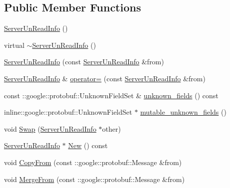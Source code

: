 \subsection*{Public Member Functions}
\begin{DoxyCompactItemize}
\item 
\hyperlink{class_i_m_1_1_base_define_1_1_server_un_read_info_a01d6ca436882ef008a90335be6be6af3}{Server\+Un\+Read\+Info} ()
\item 
virtual \hyperlink{class_i_m_1_1_base_define_1_1_server_un_read_info_a1d709543a9a24854d0494810af751d5f}{$\sim$\+Server\+Un\+Read\+Info} ()
\item 
\hyperlink{class_i_m_1_1_base_define_1_1_server_un_read_info_a98343272efd0c5d88aefb2fffe0af78f}{Server\+Un\+Read\+Info} (const \hyperlink{class_i_m_1_1_base_define_1_1_server_un_read_info}{Server\+Un\+Read\+Info} \&from)
\item 
\hyperlink{class_i_m_1_1_base_define_1_1_server_un_read_info}{Server\+Un\+Read\+Info} \& \hyperlink{class_i_m_1_1_base_define_1_1_server_un_read_info_ae37e751a0cb48ebd927aac1d242bcc84}{operator=} (const \hyperlink{class_i_m_1_1_base_define_1_1_server_un_read_info}{Server\+Un\+Read\+Info} \&from)
\item 
const \+::google\+::protobuf\+::\+Unknown\+Field\+Set \& \hyperlink{class_i_m_1_1_base_define_1_1_server_un_read_info_a4d17506d65529b21c70176ceae568d99}{unknown\+\_\+fields} () const 
\item 
inline\+::google\+::protobuf\+::\+Unknown\+Field\+Set $\ast$ \hyperlink{class_i_m_1_1_base_define_1_1_server_un_read_info_a5ac4358a5002e7e11f882dfa36a7378f}{mutable\+\_\+unknown\+\_\+fields} ()
\item 
void \hyperlink{class_i_m_1_1_base_define_1_1_server_un_read_info_aa70182f39d772af6b11cbcb31c1acfb4}{Swap} (\hyperlink{class_i_m_1_1_base_define_1_1_server_un_read_info}{Server\+Un\+Read\+Info} $\ast$other)
\item 
\hyperlink{class_i_m_1_1_base_define_1_1_server_un_read_info}{Server\+Un\+Read\+Info} $\ast$ \hyperlink{class_i_m_1_1_base_define_1_1_server_un_read_info_a367ae5a2e633a8e7a3a52507dbbab82c}{New} () const 
\item 
void \hyperlink{class_i_m_1_1_base_define_1_1_server_un_read_info_a4704db24556478e4e1589d2d5c1b6039}{Copy\+From} (const \+::google\+::protobuf\+::\+Message \&from)
\item 
void \hyperlink{class_i_m_1_1_base_define_1_1_server_un_read_info_a57adfca3e31c08737d58ee9904418e94}{Merge\+From} (const \+::google\+::protobuf\+::\+Message \&from)

\end{DoxyCompactItemize}
